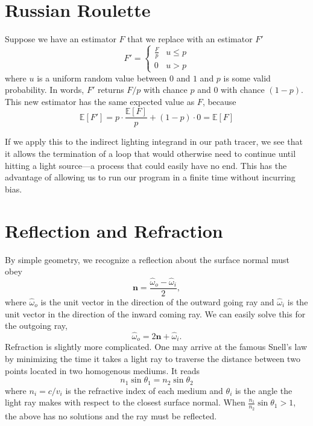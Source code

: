 \documentclass{article}
\begin{document}
\section*{Russian Roulette}

Suppose we have an estimator $F$ that we replace with
an estimator $F'$
\[
	F' = \begin{cases}
		\frac{F}{p} & u \leq p \\
		0 & u > p
	\end{cases}
\]
where $u$ is a uniform random value between $0$ and $1$ and $p$ is some valid probability. In  words, $F'$ returns $F/p$ with chance $p$ and $0$ with chance $(1 - p)$. This new estimator has the same expected value as $F$, because
\[
	\mathbb{E}[F'] = p\cdot\frac{\mathbb{E}[F]}{p} + (1 - p)\cdot0 = \mathbb{E}[F]
\]

If we apply this to the indirect lighting integrand in our path tracer, we see that it allows the termination of a loop that would otherwise need to continue until hitting a light source---a process that could easily have no end. This has the advantage of allowing us to run our program in a finite time without incurring bias.

\section*{Reflection and Refraction}

By simple geometry, we recognize a reflection about the surface normal must obey
\[
	\mathbf{n} = \frac{\hat{\omega}_o - \hat{\omega}_i}{2},
\]
where $\hat{\omega}_o$ is the unit vector in the direction of the outward going ray and $\hat{\omega}_i$ is the unit vector in the direction of the inward coming ray. We can easily solve this for the outgoing ray,
\[
	\hat{\omega}_o = 2\mathbf{n} + \hat{\omega}_i.
\]
Refraction is slightly more complicated. One may arrive at the famous Snell's law by minimizing the time it takes a light ray to traverse the distance between two points located in two homogenous mediums. It reads
\[
	n_1\sin\theta_1 = n_2\sin\theta_2
\]
where $n_i = c/v_i$ is the refractive index of each medium and $\theta_i$ is the angle the light ray makes with respect to the closest surface normal. When $\tfrac{n_1}{n_2}\sin\theta_1 > 1$, the above has no solutions and the ray must be reflected.
\end{document}
